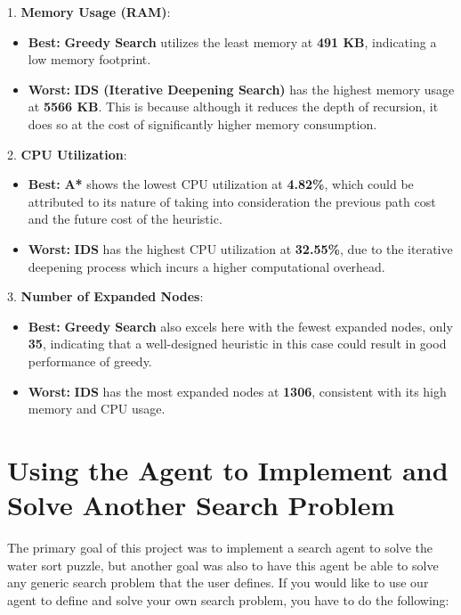 \documentclass{article}
\begin{document}
1. \textbf{Memory Usage (RAM)}:
\begin{itemize}
    \item \textbf{Best:} \textbf{Greedy Search} utilizes the least memory at \textbf{491 KB}, indicating a low memory footprint.
    \item \textbf{Worst:} \textbf{IDS (Iterative Deepening Search)} has the highest memory usage at \textbf{5566 KB}. This is because although it reduces the depth of recursion, it does so at the cost of significantly higher memory consumption.
\end{itemize}
2. \textbf{CPU Utilization}:
\begin{itemize}
    \item \textbf{Best:} \textbf{A*} shows the lowest CPU utilization at \textbf{4.82\%}, which could be attributed to its nature of taking into consideration the previous path cost and the future cost of the heuristic.
    \item \textbf{Worst:} \textbf{IDS} has the highest CPU utilization at \textbf{32.55\%}, due to the iterative deepening process which incurs a higher computational overhead.
\end{itemize}
3. \textbf{Number of Expanded Nodes}:
\begin{itemize}
    \item \textbf{Best:} \textbf{Greedy Search} also excels here with the fewest expanded nodes, only \textbf{35}, indicating that a well-designed heuristic in this case could result in good performance of greedy.
    \item \textbf{Worst:} \textbf{IDS} has the most expanded nodes at \textbf{1306}, consistent with its high memory and CPU usage.
\end{itemize}

\newpage

\section{Using the Agent to Implement and Solve Another Search Problem}

The primary goal of this project was to implement a search agent to solve the water sort puzzle, but another goal was also to have this agent be able to solve any generic search problem that the user defines. If you would like to use our agent to define and solve your own search problem, you have to do the following: 
\end{document}
